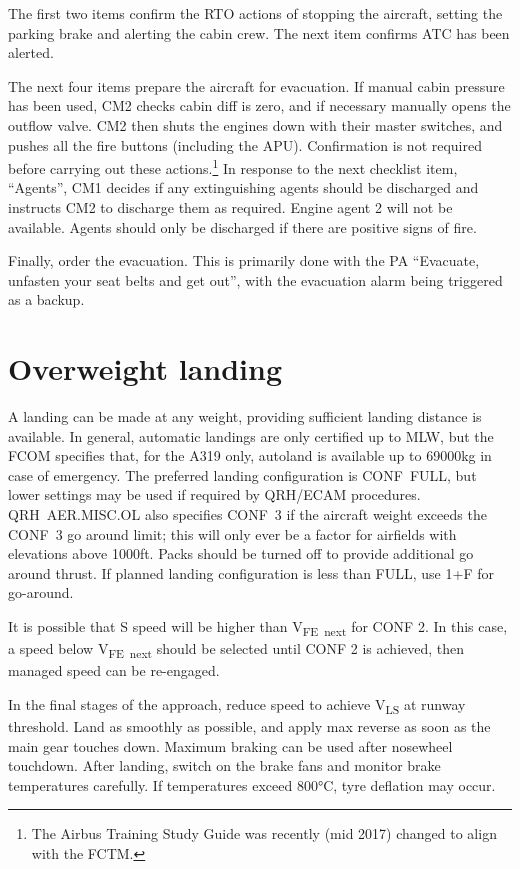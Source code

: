 \documentclass[a5paper,11pt,twoside]{book}
\newcommand{\multicite}[1]{
  \nopagebreak
  \noindent{\footnotesize\color{blue}{[ #1 ]}}
}
\newcommand{\V}[1]{V\textsubscript{#1}}
\begin{document}
The first two items confirm the RTO actions of stopping the aircraft, setting
the parking brake and alerting the cabin crew. The next item confirms ATC has
been alerted.

The next four items prepare the aircraft for evacuation. If manual cabin
pressure has been used, CM2 checks cabin diff is zero, and if necessary manually
opens the outflow valve. CM2 then shuts the engines down with their master
switches, and pushes all the fire buttons (including the APU). Confirmation is
not required before carrying out these actions.\footnote{The Airbus Training
Study Guide was recently (mid 2017) changed to align with the FCTM.}  In
response to the next checklist item, “Agents”, CM1 decides if any extinguishing
agents should be discharged and instructs CM2 to discharge them as
required. Engine agent 2 will not be available. Agents should only be discharged
if there are positive signs of fire.

Finally, order the evacuation. This is primarily done with the PA “Evacuate,
unfasten your seat belts and get out”, with the evacuation alarm being triggered
as a backup.

\multicite{EOMB 3.80.1, FCOM PRO.AER.MISC, FCTM PRO.AER.MISC}


\section{Overweight landing}

A landing can be made at any weight, providing sufficient landing distance is
available. In general, automatic landings are only certified up to MLW, but the
FCOM specifies that, for the A319 only, autoland is available up to 69000kg in
case of emergency. The preferred landing configuration is CONF FULL, but lower
settings may be used if required by QRH/ECAM procedures. QRH AER.MISC.OL also
specifies CONF 3 if the aircraft weight exceeds the CONF 3 go around limit; this
will only ever be a factor for airfields with elevations above 1000ft. Packs
should be turned off to provide additional go around thrust. If planned landing
configuration is less than FULL, use 1+F for go-around.

It is possible that S speed will be higher than \V{FE next} for CONF 2. In this
case, a speed below \V{FE next} should be selected until CONF 2 is achieved,
then managed speed can be re-engaged.

In the final stages of the approach, reduce speed to achieve \V{LS} at runway
threshold. Land as smoothly as possible, and apply max reverse as soon as the
main gear touches down. Maximum braking can be used after nosewheel
touchdown. After landing, switch on the brake fans and monitor brake
temperatures carefully. If temperatures exceed 800°C, tyre deflation may occur.
\end{document}
